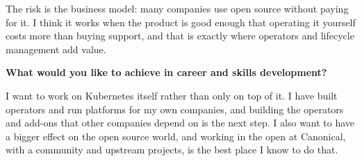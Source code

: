 The risk is the business model: many companies use open source without paying for it. I think it works when the product is good enough that operating it
yourself costs more than buying support, and that is exactly where operators and lifecycle management add value.

\noindent
\textbf{What would you like to achieve in career and skills development?}

I want to work on Kubernetes itself rather than only on top of it. I have built operators and run platforms for my own companies, and building the
operators and add-ons that other companies depend on is the next step. I also want to have a bigger effect on the open source world, and working in
the open at Canonical, with a community and upstream projects, is the best place I know to do that.
